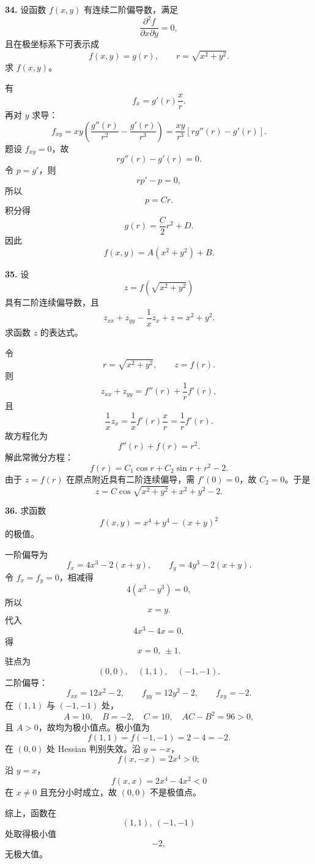 \begin{problemblock}
\textbf{34.} 设函数 \(f(x,y)\) 有连续二阶偏导数，满足
\[
\frac{\partial^2f}{\partial x\partial y}=0,
\]
且在极坐标系下可表示成
\[
f(x,y)=g(r),\qquad r=\sqrt{x^2+y^2}.
\]
求 \(f(x,y)\)。
\end{problemblock}

\begin{solutionblock}
有
\[
f_x=g'(r)\frac{x}{r}.
\]
再对 \(y\) 求导：
\[
f_{xy}=xy\left(\frac{g''(r)}{r^2}-\frac{g'(r)}{r^3}\right)
=\frac{xy}{r^3}[rg''(r)-g'(r)].
\]
题设 \(f_{xy}=0\)，故
\[
rg''(r)-g'(r)=0.
\]
令 \(p=g'\)，则
\[
rp'-p=0,
\]
所以
\[
p=Cr.
\]
积分得
\[
g(r)=\frac C2r^2+D.
\]
因此
\[
\boxed{f(x,y)=A(x^2+y^2)+B}.
\]
\end{solutionblock}

\begin{problemblock}
\textbf{35.} 设
\[
z=f\left(\sqrt{x^2+y^2}\right)
\]
具有二阶连续偏导数，且
\[
z_{xx}+z_{yy}-\frac1x z_x+z=x^2+y^2.
\]
求函数 \(z\) 的表达式。
\end{problemblock}

\begin{solutionblock}
令
\[
r=\sqrt{x^2+y^2},\qquad z=f(r).
\]
则
\[
z_{xx}+z_{yy}=f''(r)+\frac1r f'(r),
\]
且
\[
\frac1x z_x=\frac1x f'(r)\frac{x}{r}=\frac1r f'(r).
\]
故方程化为
\[
f''(r)+f(r)=r^2.
\]
解此常微分方程：
\[
f(r)=C_1\cos r+C_2\sin r+r^2-2.
\]
由于 \(z=f(r)\) 在原点附近具有二阶连续偏导，需 \(f'(0)=0\)，故 \(C_2=0\)。于是
\[
\boxed{z=C\cos\sqrt{x^2+y^2}+x^2+y^2-2}.
\]
\end{solutionblock}

\begin{problemblock}
\textbf{36.} 求函数
\[
f(x,y)=x^4+y^4-(x+y)^2
\]
的极值。
\end{problemblock}

\begin{solutionblock}
一阶偏导为
\[
f_x=4x^3-2(x+y),\qquad
f_y=4y^3-2(x+y).
\]
令 \(f_x=f_y=0\)，相减得
\[
4(x^3-y^3)=0,
\]
所以
\[
x=y.
\]
代入
\[
4x^3-4x=0,
\]
得
\[
x=0,\ \pm1.
\]
驻点为
\[
(0,0),\quad(1,1),\quad(-1,-1).
\]
二阶偏导：
\[
f_{xx}=12x^2-2,\qquad f_{yy}=12y^2-2,\qquad f_{xy}=-2.
\]
在 \((1,1)\) 与 \((-1,-1)\) 处，
\[
A=10,\quad B=-2,\quad C=10,\quad AC-B^2=96>0,
\]
且 \(A>0\)，故均为极小值点。极小值为
\[
f(1,1)=f(-1,-1)=2-4=-2.
\]
在 \((0,0)\) 处 Hessian 判别失效。沿 \(y=-x\)，
\[
f(x,-x)=2x^4>0;
\]
沿 \(y=x\)，
\[
f(x,x)=2x^4-4x^2<0
\]
在 \(x\ne0\) 且充分小时成立，故 \((0,0)\) 不是极值点。

综上，函数在
\[
\boxed{(1,1),\ (-1,-1)}
\]
处取得极小值
\[
\boxed{-2},
\]
无极大值。
\end{solutionblock}

